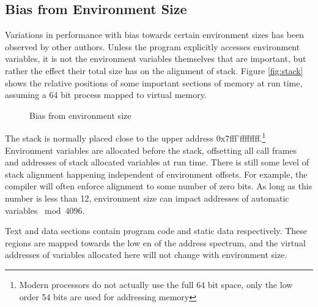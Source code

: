 \documentclass[a4paper,11pt,twocolumn,twoside]{article}
\begin{document}
\subsection{Bias from Environment Size}
Variations in performance with bias towards certain environment sizes has been observed by other authors.
Unless the program explicitly accesses environment variables, it is not the environment variables themselves that are important, but rather the effect their total size has on the alignment of stack. 
Figure \ref{fig:stack} shows the relative positions of some important sections of memory at run time, assuming a 64 bit process mapped to virtual memory. 

\begin{figure*}[t]
  \caption{Bias from environment size}
\end{figure*}

The stack is normally placed close to the upper address 0x7fff'ffffffff.\footnote{Modern processors do not actually use the full 64 bit space, only the low order 54 bits are used for addressing memory}
Environment variables are allocated before the stack, offsetting all call frames and addresses of stack allocated variables at run time.
There is still some level of stack alignment happening independent of environment offsets. For example, the compiler will often enforce alignment to some number of zero bits.
As long as this number is less than 12, environment size can impact addresses of automatic variables $\bmod 4096$.

Text and data sections contain program code and static data respectively.
These regions are mapped towards the low en of the address spectrum, and the virtual addresses of variables allocated here will not change with environment size. 
\end{document}
